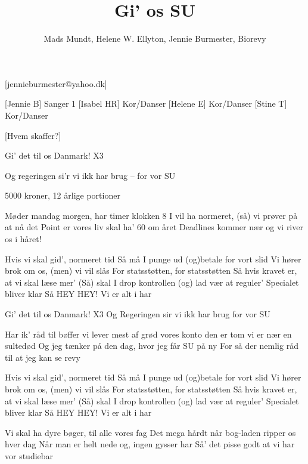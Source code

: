 \documentclass[a4paper,12pt]{article}
\title{Gi' os SU}
\author{Mads Mundt, Helene W. Ellyton, Jennie Burmester, Biorevy}
\begin{document}
\maketitle

\begin{texxers}
	[jennieburmester@yahoo.dk]
\end{texxers}

\begin{roles}
	[Jennie B] Sanger 1
	[Isabel HR] Kor/Danser
	[Helene E] Kor/Danser
	[Stine T] Kor/Danser
\end{roles}


\begin{props}
	[Hvem skaffer?] 
\end{props}

\begin{song}

Gi' det til os Danmark! X3

Og regeringen si'r vi ikk har brug -- for vor SU

5000 kroner, 12 årlige portioner	

Møder mandag morgen, har timer klokken 8
I vil ha normeret, (så) vi prøver på at nå det
Point er vores liv skal ha' 60 om året
Deadlines kommer nær og vi river os i håret!

Hvis vi skal gid', normeret tid
Så må I punge ud (og)betale for vort slid
Vi hører brok om os, (men) vi vil slås
For statsstøtten, for statsstøtten
Så hvis kravet er, at vi skal læse mer'
(Så) skal I drop kontrollen (og) lad vær at reguler'
Specialet bliver klar
Så HEY HEY! Vi er alt i har


Gi' det til os Danmark! X3
Og Regeringen sir vi ikk har brug for vor SU

Har ik' råd til bøffer vi lever mest af grød
vores konto den er tom vi er nær en sultedød 
Og jeg tænker på den dag, hvor jeg får SU på ny
For så der nemlig råd til at jeg kan se revy


Hvis vi skal gid', normeret tid
Så må I punge ud (og)betale for vort slid
Vi hører brok om os, (men) vi vil slås 
For statsstøtten, for statsstøtten
Så hvis kravet er, at vi skal læse mer'
(Så) skal I drop kontrollen (og) lad vær at reguler'
Specialet bliver klar
Så HEY HEY! Vi er alt i har


Vi skal ha dyre bøger, til alle vores fag
Det mega hårdt når bog-laden ripper os hver dag
Når man er helt nede og, ingen gysser har
Så' det pisse godt at vi har vor studiebar


\end{song}
\end{document}
